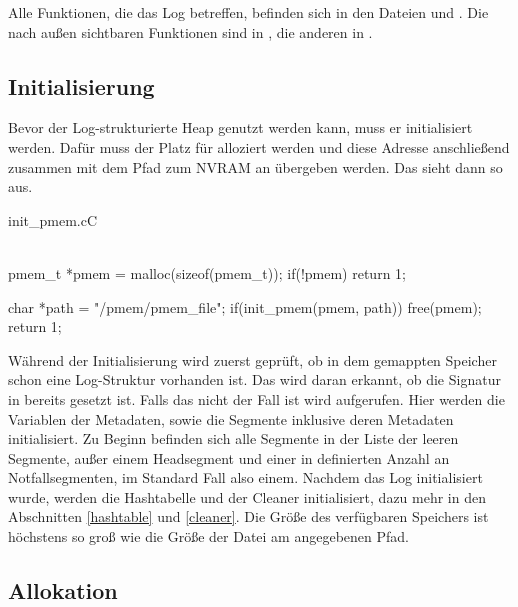 \documentclass{class/thesis}
\begin{document}
\begin{thesis}
	Alle Funktionen, die das Log betreffen, befinden sich in den Dateien  und . Die nach außen sichtbaren Funktionen sind in , die anderen in .
	
	
	\subsection{Initialisierung}
	
	Bevor der Log-strukturierte Heap genutzt werden kann, muss er initialisiert werden. Dafür muss der Platz für  alloziert werden und diese Adresse anschließend zusammen mit dem Pfad zum NVRAM an  übergeben werden. Das sieht dann so aus.
	
	\begin{codeblock}{init\_pmem.c}{C}
		\begin{ccode}\\			
			pmem_t *pmem = malloc(sizeof(pmem_t));
			if(!pmem) {
			    return 1;
			}
			
			char *path = "/pmem/pmem_file";
			if(init_pmem(pmem, path)) {
			    free(pmem);
			    return 1;
			}
		\end{ccode}
	\end{codeblock}
	
	Während der Initialisierung wird zuerst geprüft, ob in dem gemappten Speicher schon eine Log-Struktur vorhanden ist. Das wird daran erkannt, ob die Signatur in  bereits gesetzt ist. Falls das nicht der Fall ist wird  aufgerufen. 
	Hier werden die Variablen der Metadaten, sowie die Segmente inklusive deren Metadaten initialisiert. Zu Beginn befinden sich alle Segmente in der Liste der leeren Segmente, außer einem Headsegment und einer in  definierten Anzahl an Notfallsegmenten, im Standard Fall also einem.
	Nachdem das Log initialisiert wurde, werden die Hashtabelle und der Cleaner initialisiert, dazu mehr in den Abschnitten \ref{hashtable} und \ref{cleaner}.
	Die Größe des verfügbaren Speichers ist höchstens so groß wie die Größe der Datei am angegebenen Pfad.
	
	
	\subsection{Allokation}
	

\end{thesis}
\end{document}

